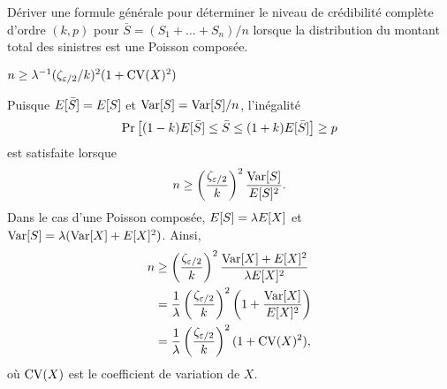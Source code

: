 \begin{exercice}
  \label{ex:stabilite:nPC}
  Dériver une formule générale pour déterminer le niveau de
  crédibilité complète d'ordre $(k, p)$ pour $\bar{S} = (S_1 + \dots +
  S_n)/n$ lorsque la distribution du montant total des sinistres est
  une Poisson composée.
  \begin{rep}
    $n \geq \lambda^{-1} (\zeta_{\varepsilon/2}/k)^2 (1 + \operatorname{CV}(X)^2)$
  \end{rep}
  \begin{sol}
    Puisque $E [ \bar{S} ] = E [ S ]$ et $\operatorname{Var} [ S ] = \operatorname{Var} [ S ]/n$,
    l'inégalité
    \begin{displaymath}
      \Pr
      \left[
        (1 - k) E [ \bar{S} ] \leq \bar{S} \leq (1 + k) E [ \bar{S} ]
      \right]
      \geq p
    \end{displaymath}
    est satisfaite lorsque
    \begin{displaymath}
      n \ge
      \left( \frac{\zeta_{\varepsilon/2}}{k} \right)^2
      \frac{\operatorname{Var} [ S ]}{E [ S ]^2}.
    \end{displaymath}
    Dans le cas d'une Poisson composée, $E [ S ] = \lambda E [ X ]$ et
    $\operatorname{Var} [ S ] = \lambda (\operatorname{Var} [ X ] + E [ X ]^2)$. Ainsi,
    \begin{align*}
      n
      & \geq \left( \frac{\zeta_{\varepsilon/2}}{k} \right)^2
      \frac{\operatorname{Var} [ X ] + E [ X ]^2}{\lambda E [ X ]^2} \\
      &= \frac{1}{\lambda} \left( \frac{\zeta_{\varepsilon/2}}{k}
      \right)^2 \left( 1 + \frac{\operatorname{Var} [ X ]}{E [ X ]^2}
      \right) \\
      &= \frac{1}{\lambda} \left( \frac{\zeta_{\varepsilon/2}}{k}
      \right)^2 (1 + \operatorname{CV}(X)^2),
    \end{align*}
    où $\operatorname{CV}(X)$ est le coefficient de variation de $X$.
  \end{sol}
\end{exercice}

